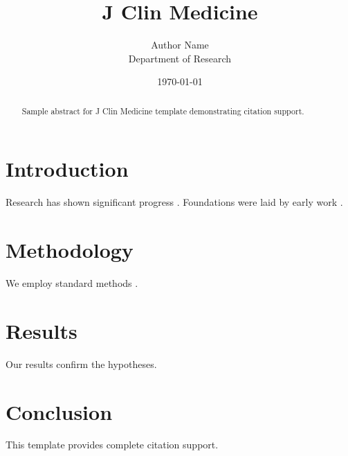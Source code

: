 \documentclass{mdpi}
\title{J Clin Medicine}
\author{Author Name \\ \small Department of Research}
\date{\today}
\begin{document}
\maketitle

\begin{abstract}
Sample abstract for J Clin Medicine template demonstrating citation support.
\end{abstract}

\section{Introduction}
Research has shown significant progress \citep{einstein1905}. Foundations were laid by early work \citep{turing1950}.

\section{Methodology}
We employ standard methods \citep{knuth1984}.

\section{Results}
Our results confirm the hypotheses.

\section{Conclusion}
This template provides complete citation support.



\end{document}

